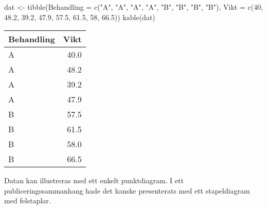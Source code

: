 \documentclass[
]{book}
\newenvironment{Shaded}{\begin{snugshade}}{\end{snugshade}}
\newcommand{\AttributeTok}[1]{\textcolor[rgb]{0.77,0.63,0.00}{#1}}
\newcommand{\DecValTok}[1]{\textcolor[rgb]{0.00,0.00,0.81}{#1}}
\newcommand{\FloatTok}[1]{\textcolor[rgb]{0.00,0.00,0.81}{#1}}
\newcommand{\FunctionTok}[1]{\textcolor[rgb]{0.00,0.00,0.00}{#1}}
\newcommand{\NormalTok}[1]{#1}
\newcommand{\OtherTok}[1]{\textcolor[rgb]{0.56,0.35,0.01}{#1}}
\newcommand{\StringTok}[1]{\textcolor[rgb]{0.31,0.60,0.02}{#1}}
\theoremstyle{definition}
\theoremstyle{definition}
\theoremstyle{definition}
\theoremstyle{definition}
\theoremstyle{remark}
\begin{document}
\begin{Shaded}
\begin{Highlighting}[]
\NormalTok{dat }\OtherTok{\textless{}{-}} \FunctionTok{tibble}\NormalTok{(}\AttributeTok{Behandling =} \FunctionTok{c}\NormalTok{(}\StringTok{"A"}\NormalTok{, }\StringTok{"A"}\NormalTok{, }\StringTok{"A"}\NormalTok{, }\StringTok{"A"}\NormalTok{, }\StringTok{"B"}\NormalTok{, }\StringTok{"B"}\NormalTok{, }\StringTok{"B"}\NormalTok{, }\StringTok{"B"}\NormalTok{),}
              \AttributeTok{Vikt =} \FunctionTok{c}\NormalTok{(}\DecValTok{40}\NormalTok{, }\FloatTok{48.2}\NormalTok{, }\FloatTok{39.2}\NormalTok{, }\FloatTok{47.9}\NormalTok{, }\FloatTok{57.5}\NormalTok{, }\FloatTok{61.5}\NormalTok{, }\DecValTok{58}\NormalTok{, }\FloatTok{66.5}\NormalTok{))}
\FunctionTok{kable}\NormalTok{(dat)}
\end{Highlighting}
\end{Shaded}

\begin{table}
\centering
\begin{tabular}[t]{lr}
\toprule
Behandling & Vikt\\
\midrule
A & 40.0\\
A & 48.2\\
A & 39.2\\
A & 47.9\\
B & 57.5\\
\addlinespace
B & 61.5\\
B & 58.0\\
B & 66.5\\
\bottomrule
\end{tabular}
\end{table}

Datan kan illustreras med ett enkelt punktdiagram. I ett publiceringssammanhang hade det kanske presenterats med ett stapeldiagram med felstaplar.
\end{document}
